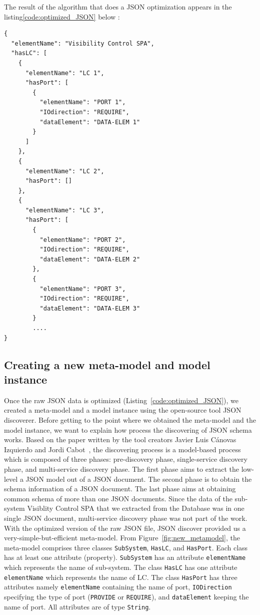 The result of the algorithm that does a JSON optimization appears in the listing\ref{code:optimized_JSON} below :

\begin{lstlisting}[caption=A sample part of the optimized JSON content,label=code:optimized_JSON]
{
  "elementName": "Visibility Control SPA",
  "hasLC": [
    {
      "elementName": "LC 1",
      "hasPort": [
        {
          "elementName": "PORT 1",
          "IOdirection": "REQUIRE",
          "dataElement": "DATA-ELEM 1"
        }
      ]
    },
    {
      "elementName": "LC 2",
      "hasPort": []
    },
    {
      "elementName": "LC 3",
      "hasPort": [
        {
          "elementName": "PORT 2",
          "IOdirection": "REQUIRE",
          "dataElement": "DATA-ELEM 2"
        },
        {
          "elementName": "PORT 3",
          "IOdirection": "REQUIRE",
          "dataElement": "DATA-ELEM 3"
        }
        ....
}
\end{lstlisting}


\subsection{Creating a new meta-model and model instance}
Once the raw JSON data is optimized (Listing~\ref{code:optimized_JSON}), we created a meta-model and a model instance using the open-source tool JSON discoverer. Before getting to the point where we obtained the meta-model and the model instance, we want to explain how process the discovering of JSON schema works. Based on the paper written by the tool creators Javier Luis Cánovas Izquierdo and Jordi Cabot~\cite{Canovas}, the discovering process is a model-based process which is composed of three phases:  pre-discovery phase, single-service discovery phase, and multi-service discovery
phase. The first phase aims to extract the low-level a JSON model out of a JSON document. The second phase is to obtain the schema information of a JSON document. The last phase aims at obtaining common schema of more than one JSON documents. Since the data of the sub-system Visiblity Control SPA that we extracted from the Database was in one single JSON document, multi-service discovery phase was not part of the work. \\

With the optimized version of the raw JSON file, JSON discover provided us a very-simple-but-efficient meta-model. From Figure~\ref{fig:new_metamodel}, the meta-model comprises three classes \texttt{SubSystem}, \texttt{HasLC}, and \texttt{HasPort}. Each class has at least one attribute (property). \texttt{SubSystem} has an attribute \texttt{elementName} which represents the name of sub-system. The class \texttt{HasLC} has one attribute \texttt{elementName} which represents the name of LC. The class \texttt{HasPort} has three attributes namely \texttt{elementName} containing the name of port, \texttt{IODirection} specifying the type of port (\texttt{PROVIDE} or \texttt{REQUIRE}), and \texttt{dataElement} keeping the name of port. All attributes are of type \texttt{String}.

